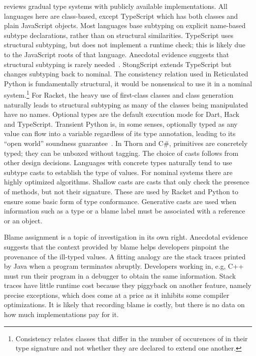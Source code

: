 \documentclass[acmlarge, anonymous, authordraft, review]{acmart} %
\begin{document}
 reviews gradual type systems with publicly available
implementations. All languages here are class-based, except TypeScript which
has both classes and plain JavaScript objects. Most languages base subtyping
on explicit name-based subtype declarations, rather than on structural
similarities.  TypeScript uses structural subtyping, but does not implement
a runtime check; this is likely due to the JavaScript roots of that
language.  Anecdotal evidence suggests that structural subtyping is rarely
needed~\cite{ecoop15}. StongScript extends TypeScript but changes subtyping
back to nominal.  The consistency relation used in Reticulated Python is
fundamentally structural, it would be nonsensical to use it in a nominal
system.\footnote{Consistency relates classes that differ in the number of
  occurences of \any in their type signature and not whether they are
  declared to extend one another.}  For Racket, the heavy use of first-class
classes and class generation naturally leads to structural subtyping as many
of the classes being manipulated have no names.  Optional types are the
default execution mode for Dart, Hack and TypeScript.  Transient Python is,
in some senses, optionally typed as any value can flow into a variable
regardless of its type annotation, leading to its ``open world'' soundness
guarantee~\cite{siek14}.  In Thorn and C\#, primitives are concretely typed;
they can be unboxed without tagging.  The choice of casts follows from other
design decisions. Languages with concrete types naturally tend to use
subtype casts to establish the type of values. For nominal systems there are
highly optimized algorithms. Shallow casts are casts that only check the
presence of methods, but not their signature. These are used by Racket and
Python to ensure some basic form of type conformance. Generative casts are
used when information such as a type or a blame label must be associated
with a reference or an object.

Blame assignment is a topic of investigation in its own right. Anecdotal
evidence suggests that the context provided by blame helps developers
pinpoint the provenance of the ill-typed values. A fitting analogy are the
stack traces printed by Java when a program terminates abruptly. Developers
working in, e.g, C++ must run their program in a debugger to obtain the same
information. Stack traces have little runtime cost because they piggyback
on another feature, namely precise exceptions, which does come at a price as
it inhibits some compiler optimizations. It is likely that recording blame
is costly, but there is no data on how much implementations pay for it.
\end{document}
